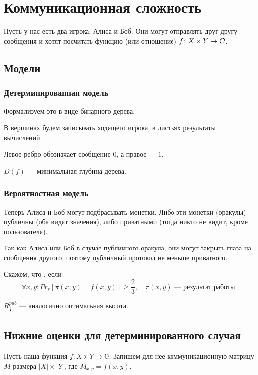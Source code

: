 \chapter{Коммуникационная сложность}
Пусть у нас есть два игрока: Алиса и Боб. Они могут отправлять друг другу сообщения и хотят посчитать функцию (или отношение) $ f \colon X \times Y \to \mathcal{O}$.

\section{Модели}

\subsection{Детерминированная модель}

Формализуем это в виде бинарного дерева. %

В вершинах будем записывать ходящего игрока, в листьях результаты вычислений.

Левое ребро обозначает сообщение $ 0$, а правое  --- $ 1$. %
\begin{name}
	$ D(f)$ --- минимальная глубина дерева.
\end{name}

\subsection{Вероятностная модель}
Теперь Алиса и Боб могут подбрасывать монетки. Либо эти монетки (оракулы) публичны (оба видят значения), либо приватными (тогда никто не видит, кроме пользователя).

Так как Алиса или Боб в случае публичного оракула, они могут закрыть глаза на сообщения другого, поэтому публичный протокол не меньше приватного.

Скажем, что , если 
\[
	\forall x, y \colon Pr_{r}[\pi(x, y) = f(x, y)] \ge \frac{2}{3}, \quad \pi(x, y) \text{ --- результат работы}
.\] 
\begin{name}
	$ R^{pub}_{\frac{2}{3}}$ --- аналогично оптимальная высота.
\end{name}

\section{Нижние оценки для детерминированного случая}
Пусть наша функция $ f\colon X \times Y \to  \mathbb{O}$. Запишем  для нее коммуникационную матрицу $ M$ размера $ \lvert X \rvert \times \lvert Y \rvert $, где $ M_{x, y} = f(x, y)$.

